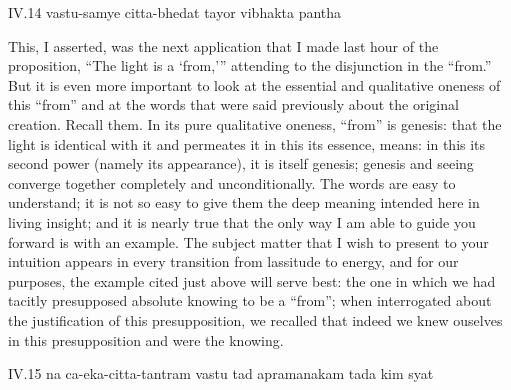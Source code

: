IV.14
vastu-samye citta-bhedat tayor vibhakta pantha

This, I asserted, was the next application
that I made last hour of the proposition,
“The light is a ‘from,'” attending to
the disjunction in the “from.”
But it is even more important to look at
the essential and qualitative oneness of this “from”
and at the words that were said previously
about the original creation.
Recall them.
In its pure qualitative oneness,
“from” is genesis:
that the light is identical with it
and permeates it in this its essence, means:
in this its second power (namely its appearance),
it is itself genesis;
genesis and seeing converge together
completely and unconditionally.
The words are easy to understand;
it is not so easy to give them the deep meaning
intended here in living insight;
and it is nearly true that the only way I am able
to guide you forward is with an example.
The subject matter that I wish to
present to your intuition appears in
every transition from lassitude to energy,
and for our purposes, the example cited
just above will serve best:
the one in which we had tacitly presupposed
absolute knowing to be a “from”;
when interrogated about the justification
of this presupposition,
we recalled that indeed we knew ouselves
in this presupposition and were the knowing.

IV.15
na ca-eka-citta-tantram vastu tad apramanakam tada kim syat

